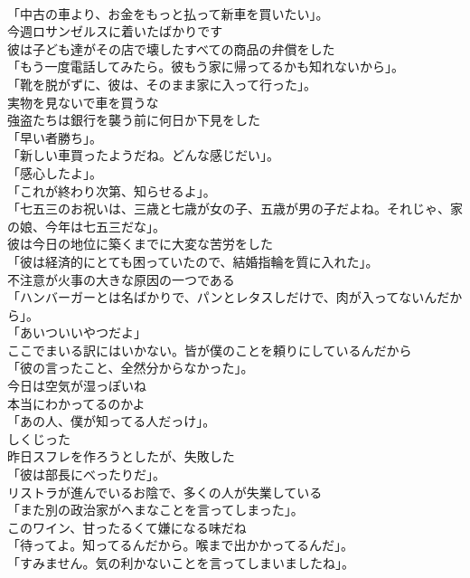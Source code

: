 \documentclass[8pt]{extreport}
\begin{document}
\begin{CJK}{UTF8}{min}
\\	「中古の車より、お金をもっと払って新車を買いたい」。	
\\	今週ロサンゼルスに着いたばかりです	
\\	彼は子ども達がその店で壊したすべての商品の弁償をした	
\\	「もう一度電話してみたら。彼もう家に帰ってるかも知れないから」。	
\\	「靴を脱がずに、彼は、そのまま家に入って行った」。	
\\	実物を見ないで車を買うな	
\\	強盗たちは銀行を襲う前に何日か下見をした	
\\	「早い者勝ち」。	
\\	「新しい車買ったようだね。どんな感じだい」。	
\\	「感心したよ」。	
\\	「これが終わり次第、知らせるよ」。	
\\	「七五三のお祝いは、三歳と七歳が女の子、五歳が男の子だよね。それじゃ、家の娘、今年は七五三だな」。	
\\	彼は今日の地位に築くまでに大変な苦労をした	
\\	「彼は経済的にとても困っていたので、結婚指輪を質に入れた」。	
\\	不注意が火事の大きな原因の一つである	
\\	「ハンバーガーとは名ばかりで、パンとレタスしだけで、肉が入ってないんだから」。	
\\	「あいついいやつだよ」	
\\	ここでまいる訳にはいかない。皆が僕のことを頼りにしているんだから	
\\	「彼の言ったこと、全然分からなかった」。	
\\	今日は空気が湿っぽいね	
\\	本当にわかってるのかよ	
\\	「あの人、僕が知ってる人だっけ」。	
\\	しくじった	
\\	昨日スフレを作ろうとしたが、失敗した	
\\	「彼は部長にべったりだ」。	
\\	リストラが進んでいるお陰で、多くの人が失業している	
\\	「また別の政治家がへまなことを言ってしまった」。	
\\	このワイン、甘ったるくて嫌になる味だね	
\\	「待ってよ。知ってるんだから。喉まで出かかってるんだ」。	
\\	「すみません。気の利かないことを言ってしまいましたね」。	

\end{CJK}
\end{document}
